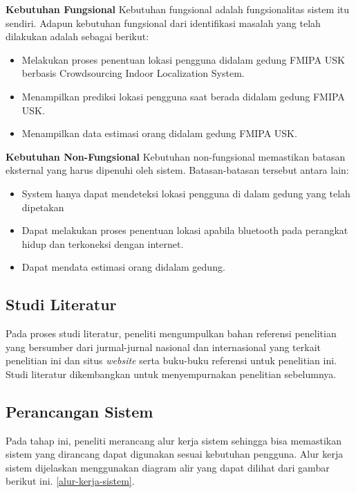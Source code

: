 \par \textbf{Kebutuhan Fungsional} Kebutuhan fungsional adalah fungsionalitas sistem itu sendiri. Adapun kebutuhan fungsional dari identifikasi masalah yang telah dilakukan adalah sebagai berikut:

\begin{itemize}
	\item Melakukan proses penentuan lokasi pengguna didalam gedung FMIPA USK berbasis Crowdsourcing Indoor Localization System.

	\item Menampilkan prediksi lokasi pengguna saat berada didalam gedung FMIPA USK.

	\item Menampilkan data estimasi orang didalam gedung FMIPA USK.

\end{itemize}

\par \textbf{Kebutuhan Non-Fungsional} Kebutuhan non-fungsional memastikan batasan eksternal yang harus dipenuhi oleh sistem. Batasan-batasan tersebut antara lain:
\begin{itemize}
	\item System hanya dapat mendeteksi lokasi pengguna di dalam gedung yang telah dipetakan

	\item Dapat melakukan proses penentuan lokasi apabila bluetooth pada perangkat hidup dan terkoneksi dengan internet.

	\item Dapat mendata estimasi orang didalam gedung.

\end{itemize}



\subsection{Studi Literatur}
Pada proses studi literatur, peneliti mengumpulkan bahan referensi penelitian yang bersumber dari jurmal-jurnal nasional dan internasional yang terkait penelitian ini dan situs \textit{website} serta buku-buku referensi untuk penelitian ini. Studi literatur dikembangkan untuk menyempurnakan penelitian sebelumnya.

\subsection{Perancangan Sistem}
Pada tahap ini, peneliti merancang alur kerja  sistem sehingga bisa memastikan sistem yang dirancang dapat digunakan sesuai kebutuhan pengguna. Alur kerja sistem dijelaskan menggunakan diagram alir yang dapat dilihat dari gambar berikut ini.
\ref{alur-kerja-sistem}.

